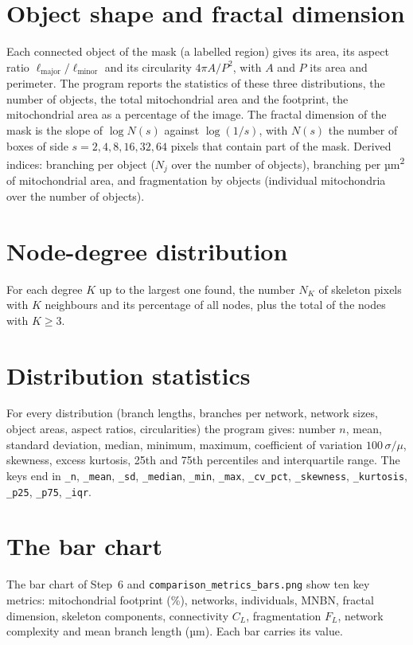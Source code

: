 \documentclass[fontsize=10.5pt,paper=a4,parskip=half,headings=normal,numbers=noenddot,
  open=any,captions=tableheading]{scrreprt}
\newcommand{\file}[1]{\texttt{#1}}
\begin{document}
\section{Object shape and fractal dimension}
Each connected object of the mask (a labelled region) gives its area, its aspect ratio $\ell_{\mathrm{major}}/\ell_{\mathrm{minor}}$ and its circularity $4\pi A/P^2$, with $A$ and $P$ its area and perimeter. The program reports the statistics of these three distributions, the number of objects, the total mitochondrial area and the footprint, the mitochondrial area as a percentage of the image. The fractal dimension of the mask is the slope of $\log N(s)$ against $\log(1/s)$, with $N(s)$ the number of boxes of side $s = 2, 4, 8, 16, 32, 64$ pixels that contain part of the mask. Derived indices: branching per object ($N_j$ over the number of objects), branching per µm\textsuperscript{2} of mitochondrial area, and fragmentation by objects (individual mitochondria over the number of objects).

\section{Node-degree distribution}
For each degree $K$ up to the largest one found, the number $N_K$ of skeleton pixels with $K$ neighbours and its percentage of all nodes, plus the total of the nodes with $K\ge3$.

\section{Distribution statistics}
For every distribution (branch lengths, branches per network, network sizes, object areas, aspect ratios, circularities) the program gives: number $n$, mean, standard deviation, median, minimum, maximum, coefficient of variation $100\,\sigma/\mu$, skewness, excess kurtosis, 25th and 75th percentiles and interquartile range. The keys end in \texttt{\_n}, \texttt{\_mean}, \texttt{\_sd}, \texttt{\_median}, \texttt{\_min}, \texttt{\_max}, \texttt{\_cv\_pct}, \texttt{\_skewness}, \texttt{\_kurtosis}, \texttt{\_p25}, \texttt{\_p75}, \texttt{\_iqr}.

\section{The bar chart}
The bar chart of Step~6 and \file{comparison\_metrics\_bars.png} show ten key metrics: mitochondrial footprint (\%), networks, individuals, MNBN, fractal dimension, skeleton components, connectivity $C_L$, fragmentation $F_L$, network complexity and mean branch length (µm). Each bar carries its value.
\end{document}
